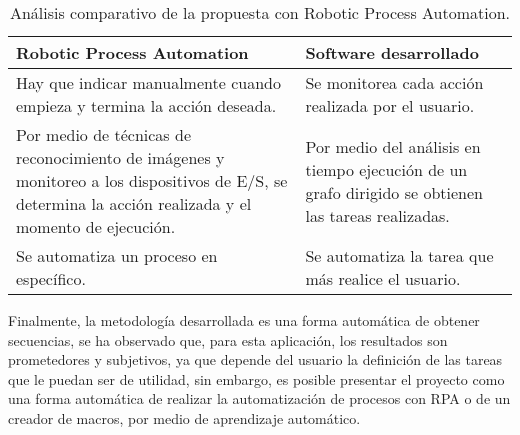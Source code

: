 \begin{table}[h]
\centering
\begin{tabular}{m{6cm}|m{6cm}}
\hline
\textbf{Robotic Process Automation}    &    \textbf{Software desarrollado} \\

\hline
Hay que indicar manualmente cuando empieza y termina la acci\'on deseada.
&
Se monitorea cada acci\'on realizada por el usuario.\\

\hline
Por medio de t\'ecnicas de reconocimiento de im\'agenes y monitoreo a los dispositivos de E/S, se determina la acci\'on realizada y el momento de ejecuci\'on. 
&
Por medio del an\'alisis en tiempo ejecuci\'on de un grafo dirigido se obtienen las tareas realizadas.\\

\hline
Se automatiza un proceso en espec\'ifico.
&
Se automatiza la tarea que m\'as realice el usuario.\\

\hline
\end{tabular}
\caption{An\'alisis comparativo de la propuesta con Robotic Process
 Automation.}
\label{vsrpa}
\end{table}


Finalmente, la metodolog\'ia desarrollada es una forma autom\'atica de obtener 
 secuencias, se ha observado que, para esta aplicaci\'on, los resultados son 
 prometedores y subjetivos, ya que depende del usuario la definici\'on de las 
 tareas que le puedan ser de utilidad, sin embargo, es posible presentar el 
 proyecto como una forma autom\'atica de realizar la automatizaci\'on de 
 procesos con RPA o de un creador de macros, por medio de aprendizaje 
 autom\'atico.